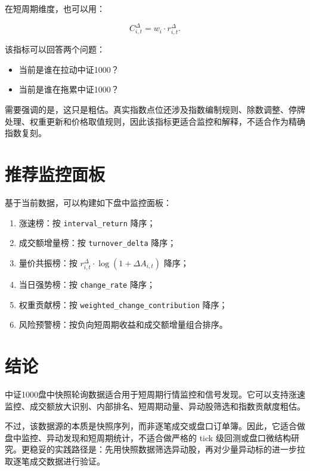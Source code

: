 \documentclass[UTF8,a4paper,12pt]{ctexart}
\begin{document}
在短周期维度，也可以用：

\begin{equation}
C_{i,t}^{\Delta} = w_i \cdot r_{i,t}^{\Delta}.
\end{equation}

该指标可以回答两个问题：

\begin{itemize}
  \item 当前是谁在拉动中证1000？
  \item 当前是谁在拖累中证1000？
\end{itemize}

需要强调的是，这只是粗估。真实指数点位还涉及指数编制规则、除数调整、停牌处理、权重更新和价格取值规则，因此该指标更适合监控和解释，不适合作为精确指数复刻。

\section{推荐监控面板}

基于当前数据，可以构建如下盘中监控面板：

\begin{enumerate}
  \item 涨速榜：按 \texttt{interval\_return} 降序；
  \item 成交额增量榜：按 \texttt{turnover\_delta} 降序；
  \item 量价共振榜：按 $r_{i,t}^{\Delta} \cdot \log(1+\Delta A_{i,t})$ 降序；
  \item 当日强势榜：按 \texttt{change\_rate} 降序；
  \item 权重贡献榜：按 \texttt{weighted\_change\_contribution} 降序；
  \item 风险预警榜：按负向短周期收益和成交额增量组合排序。
\end{enumerate}

\section{结论}

中证1000盘中快照轮询数据适合用于短周期行情监控和信号发现。它可以支持涨速监控、成交额放大识别、内部排名、短周期动量、异动股筛选和指数贡献度粗估。

不过，该数据源的本质是快照序列，而非逐笔成交或盘口订单簿。因此，它适合做盘中监控、异动发现和短周期统计，不适合做严格的 tick 级回测或盘口微结构研究。更稳妥的实践路径是：先用快照数据筛选异动股，再对少量异动标的进一步拉取逐笔成交数据进行验证。
\end{document}
